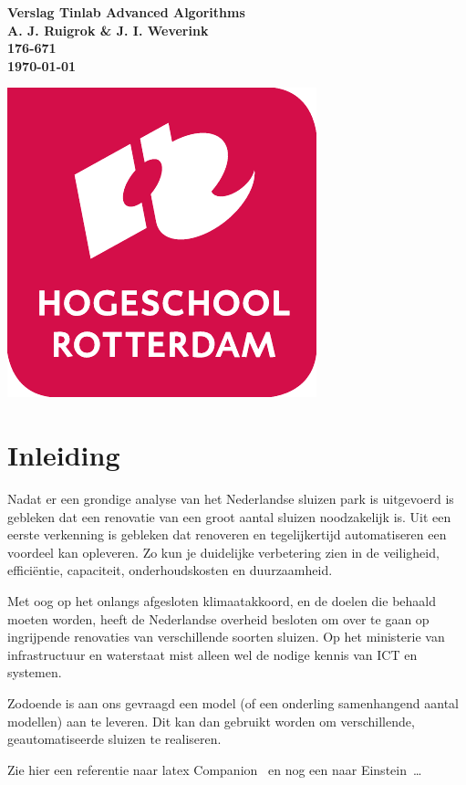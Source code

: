 \documentclass{article}
\begin{document}
\graphicspath{{../Images/}}

\sffamily
\begin{titlepage}
  \centering
    \vfill
    {\bfseries\Huge
      Verslag Tinlab Advanced Algorithms \\
        \vskip2cm
      }
      {\bfseries\Large
        A. J. Ruigrok \& J. I. Weverink\\
      }
      {
        \bfseries\normalsize
        176-671\\
        \vskip1cm
        \today\\
    }
    \vfill
    
    \includegraphics[width = 4 cm]{logohr} %
    \vfill
    \vfill
\end{titlepage}
\newpage
\tableofcontents

\clearpage %
\section{Inleiding}
Nadat er een grondige analyse van het Nederlandse sluizen park is uitgevoerd is gebleken dat een renovatie van een groot aantal sluizen noodzakelijk is. Uit een eerste verkenning is gebleken dat renoveren en tegelijkertijd automatiseren een voordeel kan opleveren. Zo kun je duidelijke verbetering zien in de veiligheid, efficiëntie, capaciteit, onderhoudskosten en duurzaamheid.

Met oog op het onlangs afgesloten klimaatakkoord, en de doelen die behaald moeten worden, heeft de Nederlandse overheid besloten om over te gaan op ingrijpende renovaties van verschillende soorten sluizen. Op het ministerie van infrastructuur en waterstaat mist alleen wel de nodige kennis van ICT en systemen.

Zodoende is aan ons gevraagd een model (of een onderling samenhangend aantal modellen) aan te leveren. Dit kan dan gebruikt worden om verschillende, geautomatiseerde sluizen te realiseren.

Zie hier een referentie naar latex Companion~\cite{latexcompanion} en nog een naar Einstein~\cite{einstein}\ldots 
\end{document}

